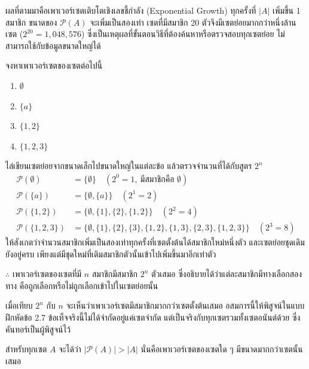 ผลที่ตามมาคือเพาเวอร์เซตเติบโตเชิงเลขชี้กำลัง (Exponential Growth) ทุกครั้งที่ $|A|$ เพิ่มขึ้น 1 สมาชิก ขนาดของ $\mathcal{P}(A)$ จะเพิ่มเป็นสองเท่า เซตที่มีสมาชิก 20 ตัวจึงมีเซตย่อยมากกว่าหนึ่งล้านเซต ($2^{20} = 1,048,576$) ซึ่งเป็นเหตุผลที่ขั้นตอนวิธีที่ต้องค้นหาหรือตรวจสอบทุกเซตย่อย ไม่สามารถใช้กับข้อมูลขนาดใหญ่ได้

\begin{ex}
\label{ex:power-set}
จงหาเพาเวอร์เซตของเซตต่อไปนี้
\begin{enumerate}
    \item $\emptyset$
    \item $\{a\}$
    \item $\{1, 2\}$
    \item $\{1, 2, 3\}$
\end{enumerate}
\end{ex}
\begin{solution}
ไล่เขียนเซตย่อยจากขนาดเล็กไปขนาดใหญ่ในแต่ละข้อ แล้วตรวจจำนวนที่ได้กับสูตร $2^n$
\begin{align*}
\mathcal{P}(\emptyset) &= \{\emptyset\} \quad (2^0 = 1,\ \text{มีสมาชิกคือ } \emptyset)\\
\mathcal{P}(\{a\}) &= \{\emptyset, \{a\}\} \quad (2^1 = 2)\\
\mathcal{P}(\{1,2\}) &= \{\emptyset, \{1\}, \{2\}, \{1,2\}\} \quad (2^2 = 4)\\
\mathcal{P}(\{1,2,3\}) &= \{\emptyset, \{1\}, \{2\}, \{3\}, \{1,2\}, \{1,3\}, \{2,3\}, \{1,2,3\}\} \quad (2^3 = 8)
\end{align*}
ให้สังเกตว่าจำนวนสมาชิกเพิ่มเป็นสองเท่าทุกครั้งที่เซตตั้งต้นได้สมาชิกใหม่หนึ่งตัว และเซตย่อยชุดเดิมยังอยู่ครบ เพียงแต่มีชุดใหม่ที่เติมสมาชิกตัวนั้นเข้าไปเพิ่มขึ้นมาอีกเท่าตัว

$\therefore$ เพาเวอร์เซตของเซตที่มี $n$ สมาชิกมีสมาชิก $2^n$ ตัวเสมอ ซึ่งอธิบายได้ว่าแต่ละสมาชิกมีทางเลือกสองทาง คือถูกเลือกหรือไม่ถูกเลือกเข้าไปในเซตย่อยนั้น \solhere
\end{solution}

เมื่อเทียบ $2^n$ กับ $n$ จะเห็นว่าเพาเวอร์เซตมีสมาชิกมากกว่าเซตตั้งต้นเสมอ อสมการนี้ให้พิสูจน์ในแบบฝึกหัดข้อ 2.7 ข้อเท็จจริงนี้ไม่ได้จำกัดอยู่แค่เซตจำกัด แต่เป็นจริงกับทุกเซตรวมทั้งเซตอนันต์ด้วย ซึ่งคันทอร์เป็นผู้พิสูจน์ไว้

\begin{thrm}
\label{thrm:cantor}
สำหรับทุกเซต $A$ จะได้ว่า $|\mathcal{P}(A)| > |A|$ นั่นคือเพาเวอร์เซตของเซตใด ๆ มีขนาดมากกว่าเซตนั้นเสมอ
\end{thrm}

